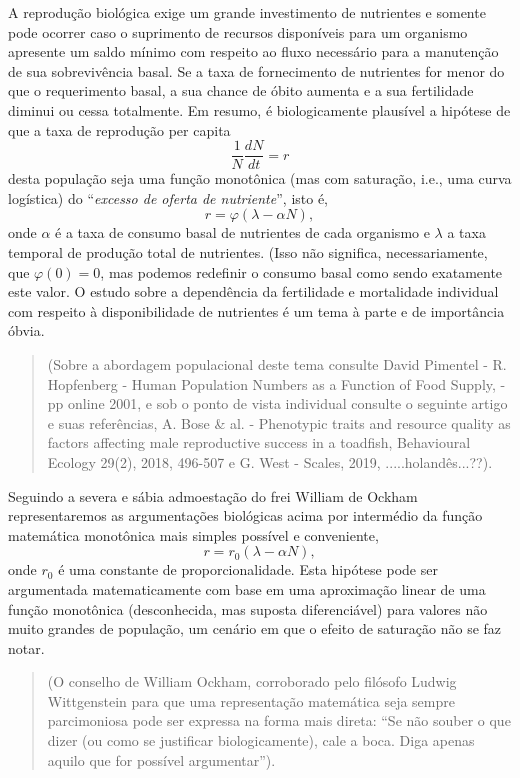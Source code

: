     A reprodução biológica exige um grande investimento de nutrientes e somente pode ocorrer caso o suprimento de recursos disponíveis para um organismo apresente um saldo mínimo com respeito ao fluxo necessário para a manutenção de sua sobrevivência basal. Se a taxa de fornecimento de nutrientes for menor do que o requerimento basal, a sua chance de óbito aumenta e a sua fertilidade diminui ou cessa totalmente. Em resumo, é biologicamente plausível a hipótese de que a taxa de reprodução per capita \[\dfrac{1}{N} \dfrac{dN}{dt} = r\]
    desta população seja uma função monotônica (mas com saturação, i.e., uma curva logística) do ``\textit{excesso de oferta de nutriente}'', isto é,
    \[r = \varphi(\lambda - \alpha N),\]
    onde \(\alpha\) é a taxa de consumo basal de nutrientes de cada organismo e \(\lambda\) a taxa temporal de produção total de nutrientes. (Isso não significa, necessariamente, que \(\varphi(0) = 0\), mas podemos redefinir o consumo basal como sendo exatamente este valor. O estudo sobre a dependência da fertilidade e mortalidade individual com respeito à disponibilidade de nutrientes é um tema à parte e de importância óbvia.

\begin{quotation}
    (Sobre a abordagem populacional deste tema consulte David Pimentel - R. Hopfenberg - Human Population Numbers as a Function of Food Supply, - pp online 2001, e sob o ponto de vista individual consulte o seguinte artigo e suas referências, A. Bose \& al. - Phenotypic traits and resource quality as factors affecting male reproductive success in a toadfish, Behavioural Ecology 29(2), 2018, 496-507 e G. West - Scales, 2019, .....holandês...??).
\end{quotation}

    Seguindo a severa e sábia admoestação do frei William de Ockham representaremos as argumentações biológicas acima por intermédio da função matemática monotônica mais simples possível e conveniente,
    \[r = r_0 (\lambda - \alpha N),\]
    onde \(r_0\) é uma constante de proporcionalidade. Esta hipótese pode ser argumentada matematicamente com base em uma aproximação linear de uma função monotônica (desconhecida, mas suposta diferenciável) para valores não muito grandes de população, um cenário em que o efeito de saturação não se faz notar. 

\begin{quotation}
    (O conselho de William Ockham, corroborado pelo filósofo Ludwig Wittgenstein para que uma representação matemática seja sempre parcimoniosa pode ser expressa na forma mais direta: ``Se não souber o que dizer (ou como se justificar biologicamente), cale a boca. Diga apenas aquilo que for possível argumentar'').
\end{quotation}

